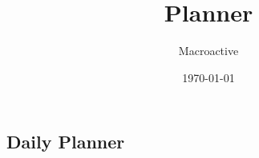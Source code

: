 

\title{Planner}
\date{\today}
\author{Macroactive}




{\let\newpage\relax\maketitle}
\newpage
\begin{center}
    \section*{\huge{Daily Planner}}
    \vspace{2cm}
\end{center}
\begin{itemize}
\end{itemize}
